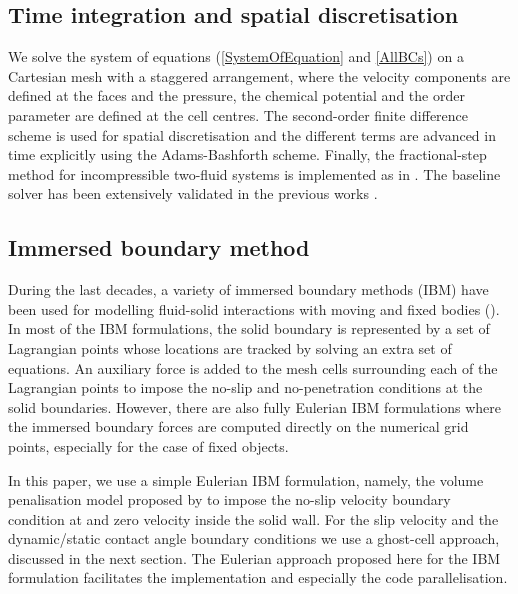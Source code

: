 \documentclass[review]{elsarticle}
\begin{document}
\subsection{Time integration and spatial discretisation} \label{Sec:discretization}
We solve the system of equations (\ref{SystemOfEquation} and \ref{AllBCs}) on a Cartesian mesh with a staggered arrangement, where the velocity components are defined at the faces and the pressure, the chemical potential and the order parameter are defined at the cell centres. The second-order finite difference scheme is used for spatial discretisation and the different terms are advanced in time explicitly using the Adams-Bashforth scheme. Finally, the fractional-step method for incompressible two-fluid systems is implemented as in \cite{DODD2014416}. The baseline solver has been extensively validated in the previous works \citep[see among others][]{rosti_ge_jain_dodd_brandt_2019,ROSTI20183,DeVita2020,rosti_izbassarov_tammisola_hormozi_brandt_2018}.

\subsection{Immersed boundary method} \label{Sec:IBM}
During the last decades, a variety of immersed boundary methods (IBM) have been used for modelling fluid-solid interactions with moving and fixed bodies (\cite{IBMreview}). 
In most of the IBM formulations, the solid boundary is represented by a set of Lagrangian points whose locations are tracked by solving an extra set of equations. An auxiliary force is added to the mesh cells surrounding each of the Lagrangian points to impose the no-slip and no-penetration conditions at the solid boundaries. However, there are also fully Eulerian IBM formulations where the immersed boundary forces are computed directly on the numerical grid points, especially for the case of fixed objects. 

In this paper, we use a simple Eulerian IBM formulation, namely, the volume penalisation model proposed by \cite{Kajishima2001} to impose the no-slip velocity boundary condition at and zero velocity inside the solid wall. For the slip velocity and the dynamic/static contact angle boundary conditions we use a ghost-cell approach, discussed in the next section. The Eulerian approach proposed here for the IBM formulation facilitates the implementation and especially the code parallelisation.
\end{document}
